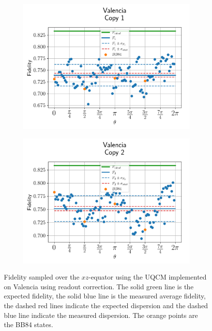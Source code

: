 \begin{figure}[H]
    \centering
    \begin{subfigure}{.45\textwidth}
      \centering
      \includegraphics[width=\textwidth]{Figures/UQCM/IBM/OnlyEquator/results_corrected_valencia_copy1.png}
    \end{subfigure}%
    \begin{subfigure}{.45\textwidth}
      \centering
      \includegraphics[width=\textwidth]{Figures/UQCM/IBM/OnlyEquator/results_corrected_valencia_copy2.png}
    \end{subfigure}
    \caption{Fidelity sampled over the $xz$-equator using the UQCM implemented on Valencia using readout correction. The solid green line is the expected fidelity, the solid blue line is the measured average fidelity, the dashed red lines indicate the expected dispersion and the dashed blue line indicate the measured dispersion. The orange points are the BB84 states.}
    \label{fig:uqcm_eq_our}
\end{figure}

